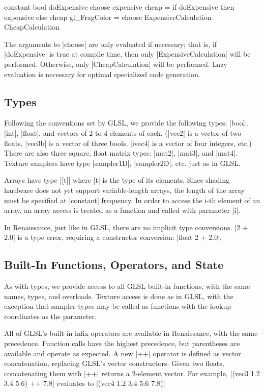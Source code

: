 \documentclass[review]{acmsiggraph}      %
\begin{document}
\begin{MyVerb}
constant bool doExpensive
choose expensive cheap = 
        if doExpensive then expensive else cheap
gl_FragColor = choose ExpensiveCalculation
                      CheapCalculation
\end{MyVerb}

The arguments to |choose| are only evaluated if necessary; that is, if
|doExpensive| is true at compile time, then only
|ExpensiveCalculation| will be performed.  Otherwise, only
|CheapCalculation| will be performed.  Lazy evaluation is necessary
for optimal specialized code generation.

\subsection{Types}

Following the conventions set by GLSL, we provide the following types:
|bool|, |int|, |float|, and vectors of 2 to 4 elements of each.
(|vec2| is a vector of two floats, |vec3b| is a vector of three bools,
|ivec4| is a vector of four integers, etc.)  There are also three
square, float matrix types: |mat2|, |mat3|, and |mat4|.  Texture
samplers have type |sampler1D|, |sampler2D|, etc. just as in GLSL.

Arrays have type |[t]| where |t| is the type of its elements.  Since
shading hardware does not yet support variable-length arrays, the
length of the array must be specified at |constant| frequency.  In
order to access the i-th element of an array, an array access is
treated as a function and called with parameter |i|.

In Renaissance, just like in GLSL, there are no implicit type conversions. 
|2 + 2.0| is a type error, requiring a constructor conversion: 
|float 2 + 2.0|.


\subsection{Built-In Functions, Operators, and State}

As with types, we provide access to all GLSL built-in functions, with
the same names, types, and overloads.  Texture access is done as in
GLSL, with the exception that sampler types may be called as functions
with the lookup coordinates as the parameter.

All of GLSL's built-in infix operators are available in Renaissance,
with the same precedence.  Function calls have the highest precedence,
but parentheses are available and operate as expected.  A new |++|
operator is defined as vector concatenation, replacing GLSL's vector
constructors.  Given two floats, concatenating them with |++| returns
a 2-element vector.  For example, |(vec3 1.2 3.4 5.6) ++ 7.8|
evaluates to |(vec4 1.2 3.4 5.6 7.8)|
\end{document}
